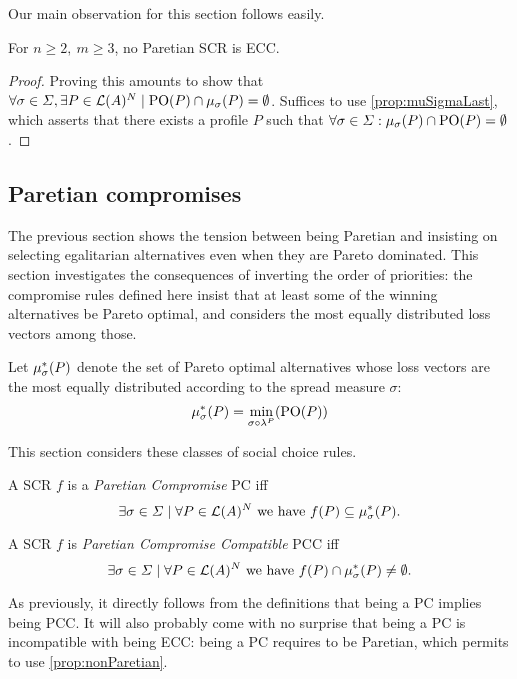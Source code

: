 \documentclass[version=3.21, pagesize, twoside=off, bibliography=totoc, DIV=calc, fontsize=12pt, a4paper]{scrartcl}
\begin{document}
Our main observation for this section follows easily.
\begin{theorem} \label{prop:nonParetian}
	For $n\geq 2, \ m\geq3$, no Paretian SCR is ECC.
\end{theorem}
\begin{proof}
	Proving this amounts to show that $\forall \sigma \in \Sigma, \exists P \in \linors^N \suchthat \paretopt(P) \cap \musigma(P) = \emptyset$. Suffices to use \cref{prop:muSigmaLast}, which asserts that there exists a profile $P$ such that $\forall \sigma \in \Sigma: \mu_{\sigma}(P) \cap \text{PO}(P) = \emptyset$.
\end{proof}

\subsection{Paretian compromises}
The previous section shows the tension between being Paretian and insisting on selecting egalitarian alternatives even when they are Pareto dominated. This section investigates the consequences of inverting the order of priorities: the compromise rules defined here insist that at least some of the winning alternatives be Pareto optimal, and considers the most equally distributed loss vectors among those.

Let $\mu_{\sigma}^*(P)$ denote the set of Pareto optimal alternatives whose loss vectors are the most equally distributed according to the spread measure $\sigma$:
\[\mu_{\sigma}^*(P) = \min_{\sigma \circ \lambda^P} (\text{PO}(P))\]


This section considers these classes of social choice rules.

\begin{definition} A SCR $f$ is a \emph{Paretian Compromise} PC iff \[\exists \sigma \in \Sigma \suchthat \forall P \in \linors^N \text{ we have } f(P) \subseteq \mustar(P).\]
\end{definition}

\begin{definition} A SCR $f$ is \emph{Paretian Compromise Compatible} PCC iff \[\exists \sigma \in \Sigma \suchthat \forall P \in \linors^N \text{ we have } f(P) \cap \mustar(P) \neq \emptyset.\]
\end{definition}

As previously, it directly follows from the definitions that being a PC implies being PCC. 
It will also probably come with no surprise that being a PC is incompatible with being ECC: being a PC requires to be Paretian, which permits to use \cref{prop:nonParetian}. 
\end{document}
